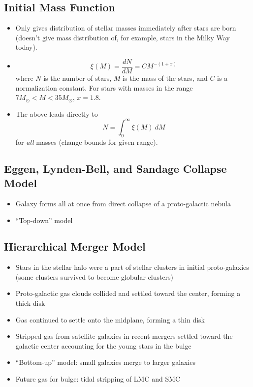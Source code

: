 \documentclass{book}
\begin{document}
\subsection{Initial Mass Function}
\begin{itemize}
    \item Only gives distribution of stellar masses immediately after stars are born (doesn't give mass distribution of, for example, stars in the Milky Way today).
    \item $$\xi (M) = \frac{dN}{dM} = C M^{-(1 + x)}$$ where $N$ is the number of stars, $M$ is the mass of the stars, and $C$ is a normalization constant. For stars with masses in the range $7 M_\odot < M < 35 M_\odot$, $x = 1.8$.
    \item The above leads directly to $$N = \int_0^\infty \xi (M)\ dM$$ for \emph{all} masses (change bounds for given range).

\end{itemize}
\subsection{Eggen, Lynden-Bell, and Sandage Collapse Model}
\begin{itemize}
    \item Galaxy forms all at once from direct collapse of a proto-galactic nebula
    \item ``Top-down'' model
\end{itemize}
\subsection{Hierarchical Merger Model}
\begin{itemize}
    \item Stars in the stellar halo were a part of stellar clusters in initial proto-galaxies (some clusters survived to become globular clusters)
    \item Proto-galactic gas clouds collided and settled toward the center, forming a thick disk
    \item Gas continued to settle onto the midplane, forming a thin disk
    \item Stripped gas from satellite galaxies in recent mergers settled toward the galactic center accounting for the young stars in the bulge
    \item ``Bottom-up'' model: small galaxies merge to larger galaxies
    \item Future gas for bulge: tidal stripping of LMC and SMC
\end{itemize}
\end{document}

